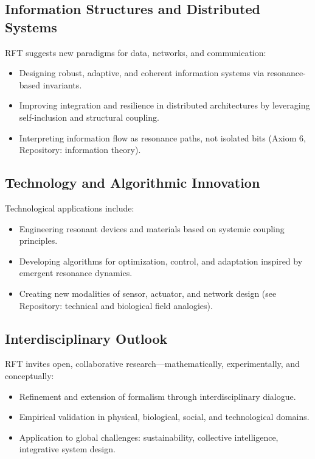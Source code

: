 \documentclass[12pt]{iopart}
\begin{document}
\subsection{Information Structures and Distributed Systems}

RFT suggests new paradigms for data, networks, and communication:
\begin{itemize}
	\item Designing robust, adaptive, and coherent information systems via resonance-based invariants.
	\item Improving integration and resilience in distributed architectures by leveraging self-inclusion and structural coupling.
	\item Interpreting information flow as resonance paths, not isolated bits (Axiom 6, Repository: information theory).
\end{itemize}

\subsection{Technology and Algorithmic Innovation}

Technological applications include:
\begin{itemize}
	\item Engineering resonant devices and materials based on systemic coupling principles.
	\item Developing algorithms for optimization, control, and adaptation inspired by emergent resonance dynamics.
	\item Creating new modalities of sensor, actuator, and network design (see Repository: technical and biological field analogies).
\end{itemize}

\subsection{Interdisciplinary Outlook}

RFT invites open, collaborative research—mathematically, experimentally, and conceptually:
\begin{itemize}
	\item Refinement and extension of formalism through interdisciplinary dialogue.
	\item Empirical validation in physical, biological, social, and technological domains.
	\item Application to global challenges: sustainability, collective intelligence, integrative system design.
\end{itemize}
\end{document}
